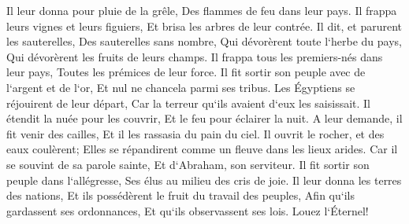 \verse Il leur donna pour pluie de la grêle, Des flammes de feu dans leur pays. 
\verse Il frappa leurs vignes et leurs figuiers, Et brisa les arbres de leur contrée. 
\verse Il dit, et parurent les sauterelles, Des sauterelles sans nombre, 
\verse Qui dévorèrent toute l`herbe du pays, Qui dévorèrent les fruits de leurs champs. 
\verse Il frappa tous les premiers-nés dans leur pays, Toutes les prémices de leur force. 
\verse Il fit sortir son peuple avec de l`argent et de l`or, Et nul ne chancela parmi ses tribus. 
\verse Les Égyptiens se réjouirent de leur départ, Car la terreur qu`ils avaient d`eux les saisissait. 
\verse Il étendit la nuée pour les couvrir, Et le feu pour éclairer la nuit. 
\verse A leur demande, il fit venir des cailles, Et il les rassasia du pain du ciel. 
\verse Il ouvrit le rocher, et des eaux coulèrent; Elles se répandirent comme un fleuve dans les lieux arides. 
\verse Car il se souvint de sa parole sainte, Et d`Abraham, son serviteur. 
\verse Il fit sortir son peuple dans l`allégresse, Ses élus au milieu des cris de joie. 
\verse Il leur donna les terres des nations, Et ils possédèrent le fruit du travail des peuples, 
\verse Afin qu`ils gardassent ses ordonnances, Et qu`ils observassent ses lois. Louez l`Éternel! 

\chapter{}

